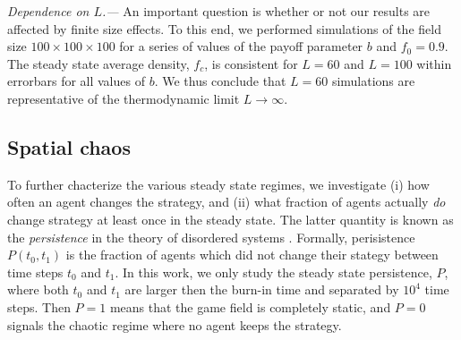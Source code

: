 \documentclass[a4paper]{jpconf}
\begin{document}
\emph{Dependence on $L$.---} An important question is whether or not our results are affected by finite size effects. To this end, we performed simulations of the field size $100\times 100\times 100$ for a series of values of the payoff parameter $b$ and $f_0=0.9$. The steady state average density, $f_c$, is consistent for $L=60$ and $L=100$ within errorbars for all values of $b$. We thus conclude that $L=60$ simulations are representative of the thermodynamic limit $L\to\infty$.

\subsection{Spatial chaos}
\label{subsec:chaos}

To further chacterize the various steady state regimes, we investigate (i) how often an agent
changes the strategy, and (ii) what fraction of agents actually \emph{do} change
strategy at least once in the steady state. 
The latter quantity is known as the \emph{persistence} in the theory of disordered systems \cite{Bray1994, Majumdar1999}. Formally, perisistence $P(t_0, t_1)$ is the fraction of agents which did not change their stategy between time steps $t_0$ and $t_1$. In this work, we only study the steady state persistence, $P$, where both $t_0$ and $t_1$ are larger then the burn-in time and separated by $10^4$ time steps. Then $P=1$ means that the game field is completely static, and $P=0$ signals the chaotic regime where no agent keeps the strategy. 
\end{document}
